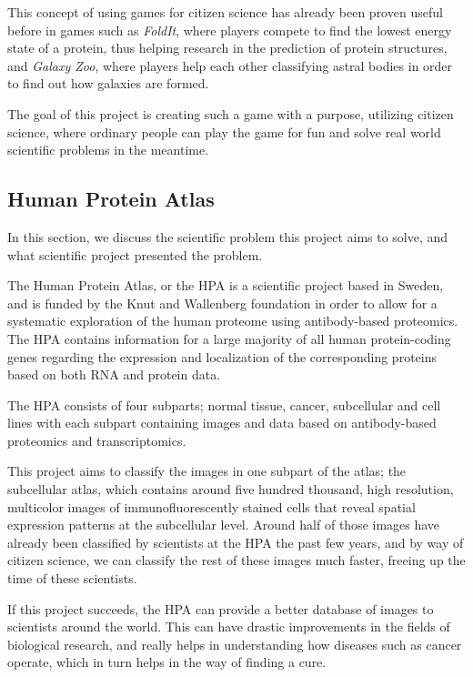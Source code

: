 	This concept of using games for citizen science has already been proven useful before in games such as \emph{FoldIt}, where players compete to find the lowest energy state of a protein, thus helping research in the prediction of protein structures, and \emph{Galaxy Zoo}, where players help each other classifying astral bodies in order to find out how galaxies are formed.

	The goal of this project is creating such a game with a purpose, utilizing citizen science, where ordinary people can play the game for fun and solve real world scientific problems in the meantime.


\subsection{Human Protein Atlas}
	In this section, we discuss the scientific problem this project aims to solve, and what scientific project presented the problem.

	The Human Protein Atlas, or the HPA is a scientific project based in Sweden, and is funded by the Knut and Wallenberg foundation in order to allow for a systematic exploration of the human proteome using antibody-based proteomics. The HPA contains information for a large majority of all human protein-coding genes regarding the expression and localization of the corresponding proteins based on both RNA and protein data.

	The HPA consists of four subparts; normal tissue, cancer, subcellular and cell lines with each subpart containing images and data based on antibody-based proteomics and transcriptomics.

	This project aims to classify the images in one subpart of the atlas; the subcellular atlas, which contains around five hundred thousand, high resolution, multicolor images of immunofluorescently stained cells that reveal spatial expression patterns at the subcellular level. Around half of those images have already been classified by scientists at the HPA the past few years, and by way of citizen science, we can classify the rest of these images much faster, freeing up the time of these scientists.

	If this project succeeds, the HPA can provide a better database of images to scientists around the world. This can have drastic improvements in the fields of biological research, and really helps in understanding how diseases such as cancer operate, which in turn helps in the way of finding a cure.

